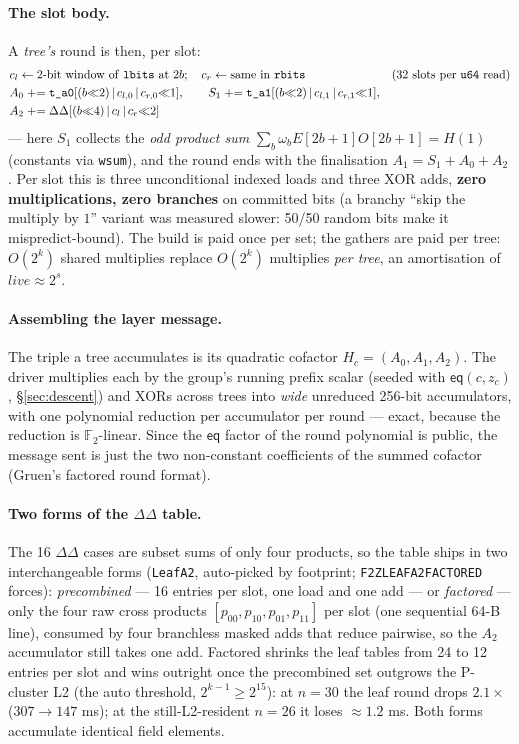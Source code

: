 \documentclass[11pt]{article}
\newcommand{\F}{\mathbb{F}}
\newcommand{\Ftwo}{\F_2}
\newcommand{\eq}{\mathsf{eq}}
\newcommand{\code}[1]{{\def\_{\textunderscore\allowbreak}\texttt{#1}}}
\theoremstyle{definition}
\begin{document}
\paragraph{The slot body.}
A \emph{tree's} round is then, per slot:
\[
  \begin{aligned}
    &c_l \leftarrow \text{2-bit window of \code{lbits} at } 2b; \quad
     c_r \leftarrow \text{same in \code{rbits}}
     && \text{(32 slots per \code{u64} read)}\\
    &A_0 \mathrel{+}= \code{t\_a0}[(b{\ll}2)\,|\,c_{l,0}\,|\,c_{r,0}{\ll}1], \qquad
     S_1 \mathrel{+}= \code{t\_a1}[(b{\ll}2)\,|\,c_{l,1}\,|\,c_{r,1}{\ll}1], \\
    &A_2 \mathrel{+}= \Delta\Delta[(b{\ll}4)\,|\,c_l\,|\,c_r{\ll}2]
  \end{aligned}
\]
--- here $S_1$ collects the \emph{odd product sum}
$\sum_b \omega_b E[2b{+}1]O[2b{+}1] = H(1)$ (constants via
\code{w\_sum}), and the round ends with the finalisation
$A_1 = S_1 + A_0 + A_2$.  Per slot this is three unconditional indexed
loads and three XOR adds,
\textbf{zero multiplications, zero branches} on committed bits (a
branchy ``skip the multiply by $1$'' variant was measured slower:
50/50 random bits make it mispredict-bound).  The build is paid once
per set; the gathers are paid per tree: $O(2^k)$ shared multiplies
replace $O(2^k)$ multiplies \emph{per tree}, an amortisation of
$\mathit{live} \approx 2^s$.

\paragraph{Assembling the layer message.}
The triple a tree accumulates is its quadratic cofactor
$H_c = (A_0, A_1, A_2)$.  The driver multiplies each by the group's
running prefix scalar (seeded with $\eq(c, z_c)$,
\S\ref{sec:descent}) and XORs across trees into \emph{wide} unreduced
256-bit accumulators, with one polynomial reduction per accumulator per
round --- exact, because the reduction is $\Ftwo$-linear.  Since the
$\eq$ factor of the round polynomial is public, the message sent is
just the two non-constant coefficients of the summed cofactor
(Gruen's factored round format).

\paragraph{Two forms of the $\Delta\Delta$ table.}
The 16 $\Delta\Delta$ cases are subset sums of only four products, so
the table ships in two interchangeable forms (\code{LeafA2},
auto-picked by footprint; \code{F2Z\_LEAF\_A2\_FACTORED} forces):
\emph{precombined} --- 16 entries per slot, one load and one add ---
or \emph{factored} --- only the four raw cross products
$[p_{00}, p_{10}, p_{01}, p_{11}]$ per slot (one sequential 64-B
line), consumed by four branchless masked adds that reduce pairwise,
so the $A_2$ accumulator still takes one add.  Factored shrinks the
leaf tables from 24 to 12 entries per slot and wins outright once the
precombined set outgrows the P-cluster L2 (the auto threshold,
$2^{k-1} \ge 2^{15}$): at $n = 30$ the leaf round drops $2.1\times$
($307 \to 147$ ms); at the still-L2-resident $n = 26$ it loses
${\approx}1.2$ ms.  Both forms accumulate identical field elements.
\end{document}

